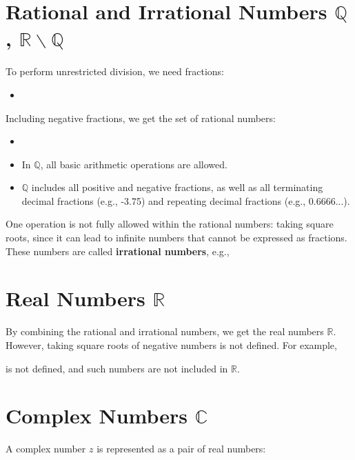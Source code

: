 \section{Rational and Irrational Numbers $\mathbb{Q}$, $\mathbb{R \backslash \mathbb{Q}}$}\label{Rational and Irrational Numbers}
To perform unrestricted division, we need fractions:
\begin{itemize}
    \item {}
\end{itemize}
Including negative fractions, we get the set of rational numbers:
\begin{itemize}
    \item {}
    \item In $\mathbb{Q}$, all basic arithmetic operations are allowed.
    \item $\mathbb{Q}$ includes all positive and negative fractions, as well as all terminating decimal fractions (e.g., -3.75) and repeating decimal fractions (e.g., 0.6666...).
\end{itemize}
One operation is not fully allowed within the rational numbers: taking square roots, since it can lead to infinite numbers that cannot be expressed as fractions. These numbers are called \textbf{irrational numbers}, e.g., 


\section{Real Numbers $\mathbb{R}$}\label{Real Numbers}
By combining the rational and irrational numbers, we get the real numbers $\mathbb{R}$. However, taking square roots of negative numbers is not defined. For example,


is not defined, and such numbers are not included in $\mathbb{R}$.

\section{Complex Numbers $\mathbb{C}$}\label{Complex Numbers}
A complex number \( z \) is represented as a pair of real numbers:


